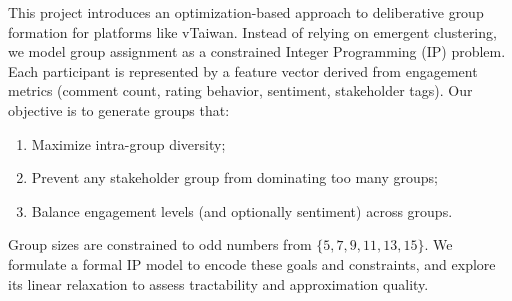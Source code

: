 This project introduces an optimization-based approach
to deliberative group formation for platforms like vTaiwan.
Instead of relying on emergent clustering,
we model group assignment as a constrained Integer Programming (IP) problem.
Each participant is represented by a feature vector derived from engagement metrics
(comment count, rating behavior, sentiment, stakeholder tags).
Our objective is to generate groups that:
\begin{enumerate}
  \item Maximize intra-group diversity;
  \item Prevent any stakeholder group from dominating too many groups;
  \item Balance engagement levels (and optionally sentiment) across groups.
\end{enumerate}
Group sizes are constrained to odd numbers from $\{5,7,9,11,13,15\}$.
We formulate a formal IP model to encode these goals and constraints,
and explore its linear relaxation to assess tractability and approximation quality.
